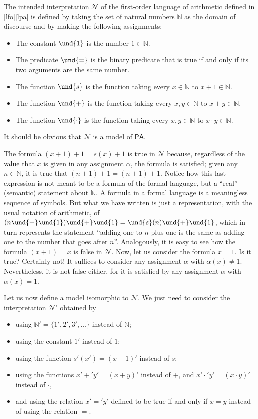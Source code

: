 \begin{example}
The intended interpretation $\mathcal{N}$ of the first-order language of arithmetic defined in \ref{lfo}\ref{lpa} is defined by taking the set of natural numbers $\mathbb{N}$ as the domain of discourse and by making the following assignments:
\begin{itemize}
\item The constant $\und{1}$ is the number $1\in \mathbb{N}$.
\item The predicate $\und{=}$ is the binary predicate that is true if and only if its two arguments are the same number.
\item The function $\und{s}$ is the function taking every $x\in \mathbb{N}$ to $x+1\in\mathbb{N}$.
\item The function $\und{+}$ is the function taking every $x,y\in \mathbb{N}$ to $x+y\in\mathbb{N}$.
\item The function $\und{\cdot}$ is the function taking every $x,y\in \mathbb{N}$ to $x\cdot y \in \mathbb{N}$.
\end{itemize}
It should be obvious that $\mathcal{N}$ is a model of $\mathsf{PA}$.

The formula $(x+1) + 1= s(x) + 1$ is true in $\mathcal{N}$ because, regardless of the value that $x$ is given in any assignment $\alpha$, the formula is satisfied; given any $n\in \mathbb{N}$, it is true that $(n+1) + 1 = (n+1) + 1$. Notice how this last expression is not meant to be a formula of the formal language, but a ``real'' (semantic) statement about $\mathbb{N}$.
A formula in a formal language is a meaningless sequence of symbols. But what we have written is just a representation, with the usual notation of arithmetic, of $(n\und{+}\und{1})\und{+}\und{1} = \und{s}(n)\und{+}\und{1}$, which in turn represents the statement ``adding one to $n$ plus one is the same as adding one to the number that goes after $n$''.
Analogously, it is easy to see how the formula $(x+1) = x$ is false in $\mathcal{N}$. Now, let us consider the formula $x = 1$. Is it true? Certainly not! It suffices to consider any assignment $\alpha$ with $\alpha(x) \neq 1$.
Nevertheless, it is not false either, for it is satisfied by any assignment $\alpha$ with $\alpha(x) = 1$. 

Let us now define a model isomorphic to $\mathcal{N}$. We just need to consider the interpretation $\mathcal{N}'$ obtained by
\begin{itemize}
\item using $\mathbb{N}'=\{1',2',3',\ldots\}$ instead of $\mathbb{N}$;
\item using the constant $1'$ instead of $1$;
\item using the function $s'(x') = (x+1)'$ instead of $s$;
\item using the functions $x'+' y' = (x+y)'$ instead of $+$, and  $x'\cdot' y' = (x\cdot y)'$ instead of $\cdot$,
\item and using the relation $x' =' y'$ defined to be true if and only if $x = y$ instead of using the relation $=$.
\end{itemize}


\end{example}

